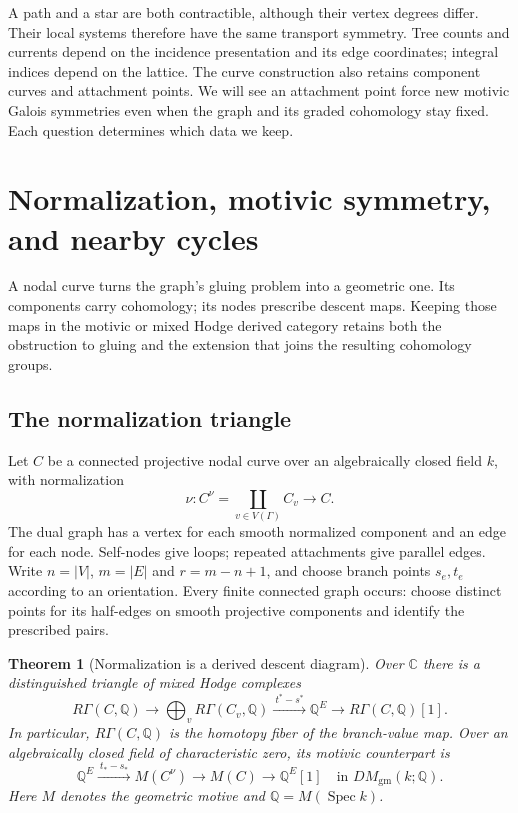 \documentclass[11pt]{article}
\newtheorem{theorem}{Theorem}[section]
\theoremstyle{definition}
\theoremstyle{remark}
\newcommand{\Q}{\mathbb Q}
\newcommand{\C}{\mathbb C}
\begin{document}
A path and a star are both contractible, although their vertex degrees differ. Their local systems therefore have the same transport symmetry. Tree counts and currents depend on the incidence presentation and its edge coordinates; integral indices depend on the lattice. The curve construction also retains component curves and attachment points. We will see an attachment point force new motivic Galois symmetries even when the graph and its graded cohomology stay fixed. Each question determines which data we keep.


\section{Normalization, motivic symmetry, and nearby cycles}

A nodal curve turns the graph's gluing problem into a geometric one. Its
components carry cohomology; its nodes prescribe descent maps. Keeping
those maps in the motivic or mixed Hodge derived category retains both the obstruction to gluing
and the extension that joins the resulting cohomology groups.

\subsection{The normalization triangle}
\label{sec:graph-inside-curve}

Let $C$ be a connected projective nodal curve over an algebraically closed
field $k$, with normalization
\[
 \nu:C^\nu=\coprod_{v\in V(\Gamma)}C_v\longrightarrow C.
\]
The dual graph has a vertex for each smooth normalized component and an
edge for each node. Self-nodes give loops; repeated attachments give
parallel edges. Write $n=|V|$, $m=|E|$ and $r=m-n+1$, and choose branch
points $s_e,t_e$ according to an orientation. Every finite connected graph
occurs: choose distinct points for its half-edges on smooth projective
components and identify the prescribed pairs.

\begin{theorem}[Normalization is a derived descent diagram]
\label{thm:derived-normalization}
Over $\C$ there is a distinguished triangle of mixed Hodge complexes
\begin{equation}\label{eq:derived-normalization-triangle}
 R\Gamma(C,\Q)\longrightarrow
 \bigoplus_v R\Gamma(C_v,\Q)
 \xrightarrow{\ t^*-s^*\ }\Q^E
 \longrightarrow R\Gamma(C,\Q)[1].
\end{equation}
In particular, $R\Gamma(C,\Q)$ is the homotopy fiber of the branch-value
map. Over an algebraically closed field of characteristic zero, its motivic counterpart is
\begin{equation}\label{eq:derived-normalization-motive}
 \Q^E\xrightarrow{\ t_*-s_*\ }M(C^\nu)
 \longrightarrow M(C)\longrightarrow\Q^E[1]
 \quad\text{in }DM_{\mathrm{gm}}(k;\Q).
\end{equation}
Here $M$ denotes the geometric motive and $\Q=M(\operatorname{Spec}k)$.
\end{theorem}
\end{document}
